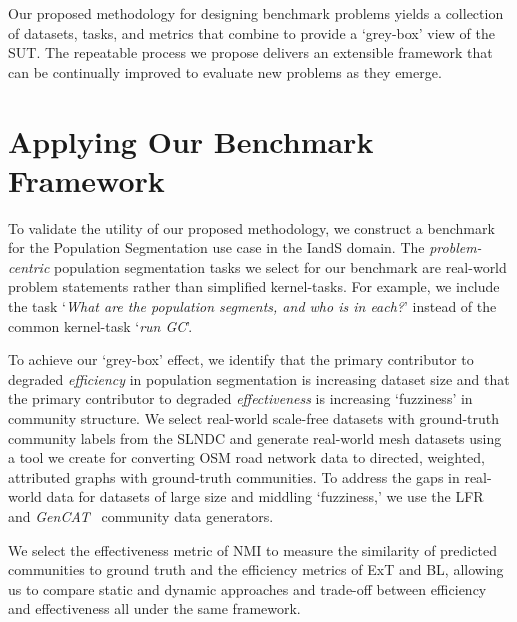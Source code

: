 Our proposed methodology for designing benchmark problems yields a collection of datasets, tasks, and metrics that combine to provide a `grey-box' view of the \ac{SUT}. 
The repeatable process we propose delivers an extensible framework that can be continually improved to evaluate new \gai problems as they emerge.


\section{Applying Our \gai Benchmark Framework}
To validate the utility of our proposed methodology, we construct a \gai benchmark for the Population Segmentation use case in the \ac{IandS} domain.
%
The \textit{problem-centric} population segmentation tasks we select for our benchmark are real-world problem statements rather than simplified kernel-tasks. 
For example, we include the task `\textit{What are the population segments, and who is in each?}' instead of the common kernel-task `\textit{run \ac{GC}}'.

To achieve our `grey-box' effect, we identify that the primary contributor to degraded \textit{efficiency} in population segmentation is increasing dataset size and that the primary contributor to degraded \textit{effectiveness} is increasing `fuzziness' in community structure. 
We select real-world scale-free datasets with ground-truth community labels from the \ac{SLNDC} and generate real-world mesh datasets using a tool we create for converting \ac{OSM} road network data to directed, weighted, attributed graphs with ground-truth communities.
To address the gaps in real-world data for datasets of large size and middling `fuzziness,' we use the \ac{LFR}~\cite{Lancichinetti2008} and \textit{GenCAT}~\cite{Maekawa2023} community data generators. 

We select the effectiveness metric of \ac{NMI} to measure the similarity of predicted communities to ground truth and the efficiency metrics of \ac{ExT} and \ac{BL}, allowing us to compare static and dynamic approaches and trade-off between efficiency and effectiveness all under the same framework. 



